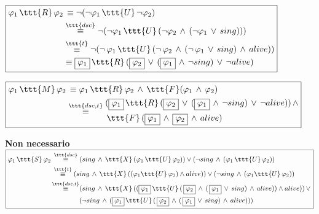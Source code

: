 \documentclass[11pt]{article}
\begin{document}
\vspace{0.25cm}

$\boxed{\begin{aligned}
            \varphi_1\,\ttt{R}\,\varphi_2 &\,\overset{}{\equiv} \neg(\neg\varphi_1\,\ttt{U}\,\neg\varphi_2) \\
            &\overset{\ttt{dsc}}{\equiv} \neg(\neg\varphi_1\,\ttt{U}\,(\neg\varphi_2\,\land\,(\neg\varphi_1\,\lor\,sing)))\\
            &\overset{\ttt{t}}{\equiv} \neg(\neg\,\varphi_1\,\ttt{U}\,(\neg\,\varphi_2\,\land\,(\neg\,\varphi_1\,\lor\,sing)\,\land\,alive))\\
            &\equiv \boxed{\varphi_1}\,\ttt{R}\,(\boxed{\varphi_2}\,\lor\,(\boxed{\varphi_1}\,\land\,\neg sing)\,\lor\,\neg alive)
\end{aligned}}$

\vspace{0.25cm}

$\boxed{\begin{aligned}
      \varphi_1\,\ttt{M}\,\varphi_2 &\,\equiv \varphi_1\,\ttt{R}\,\varphi_2\,\land\,\ttt{F}(\varphi_1\,\land\,\varphi_2) \\
      &\overset{\ttt{dsc,t}}{\equiv} \begin{aligned}
                                     &(\boxed{\varphi_1}\,\ttt{R}\,(\boxed{\varphi_2}\,\lor\,(\boxed{\varphi_1}\,\land\,\neg sing)\,\lor\,\neg alive))\,\land\\
                                     &\,\ttt{F}\,(\boxed{\varphi_1}\,\land\,\boxed{\varphi_2}\,\land\,alive)
      \end{aligned}
\end{aligned}}$

\vspace{1.5cm}

\textbf{Non necessario}\\
\vspace{0.15cm}
$\boxed{\begin{aligned}
      \varphi_1\,\ttt{S}\,\varphi_2 \,&\overset{\ttt{dsc}}{\equiv} (sing\,\land\,\ttt{X}\,(\varphi_1\,\ttt{U}\,\varphi_2)) \lor (\neg sing\,\land\,(\varphi_1\,\ttt{U}\,\varphi_2))\\
      &\overset{\ttt{t}}{\equiv} (sing\,\land\,\ttt{X}\,((\varphi_1\ttt{U}\,\varphi_2) \land alive)) \lor (\neg sing\,\land\,(\varphi_1\ttt{U}\,\varphi_2))\\
      &\begin{aligned}\overset{\ttt{dsc,t}}{\equiv}&(sing\,\land\,\ttt{X}\,((\boxed{\varphi_1}\,\ttt{U}\,(\,\boxed{\varphi_2}\,\land\,(\,\boxed{\varphi_1}\,\lor\,sing)\,\land\,alive)) \land alive))\,\lor\, \\
      &(\neg sing\,\land\,(\boxed{\varphi_1}\,\ttt{U}\,(\,\boxed{\varphi_2}\,\land\,(\,\boxed{\varphi_1}\,\lor\,sing)\,\land\,alive)))\end{aligned}
\end{aligned}}$
\end{document}
